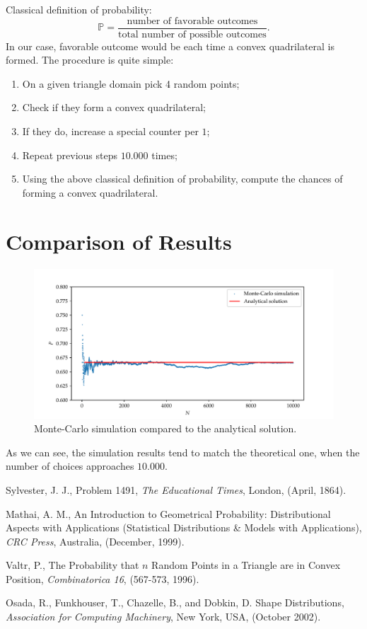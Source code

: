 \documentclass{article}
\renewcommand{\P}{\mathbb{P}}
\begin{document}
Classical definition of probability:
\begin{equation*}
    \P = \frac{\text{number of favorable outcomes}}{\text{total number of possible outcomes}}.
\end{equation*}
In our case, favorable outcome would be each time a convex quadrilateral is formed.
The procedure is quite simple:
\begin{enumerate}
    \item On a given triangle domain pick 4 random points;
    \item Check if they form a convex quadrilateral;
    \item If they do, increase a special counter per $1$;
    \item Repeat previous steps $10.000$ times;
    \item Using the above classical definition of probability, compute the chances of forming a convex quadrilateral.
\end{enumerate}

\section{Comparison of Results}
\begin{figure}[h!]
    \centering
    \includegraphics[width=1.0\textwidth]{images/result.pdf}
    \caption{Monte-Carlo simulation compared to the analytical solution.}
\end{figure}

As we can see, the simulation results tend to match the theoretical one, when the number of choices approaches $10.000$.

\newpage

\begin{thebibliography}{9}
    Sylvester, J. J., Problem 1491,
    \textit{The Educational Times},
    London, (April, 1864).

    Mathai, A. M., An Introduction to Geometrical Probability: Distributional Aspects with Applications (Statistical Distributions \& Models with Applications),
    \textit{CRC Press},
    Australia, (December, 1999).

    Valtr, P., The Probability that $n$ Random Points in a Triangle are in Convex Position,
    \textit{Combinatorica 16},
    (567-573, 1996).

    Osada, R., Funkhouser, T., Chazelle, B., and Dobkin, D. Shape Distributions,
    \textit{Association for Computing Machinery},
    New York, USA, (October 2002).
\end{thebibliography}
\end{document}
